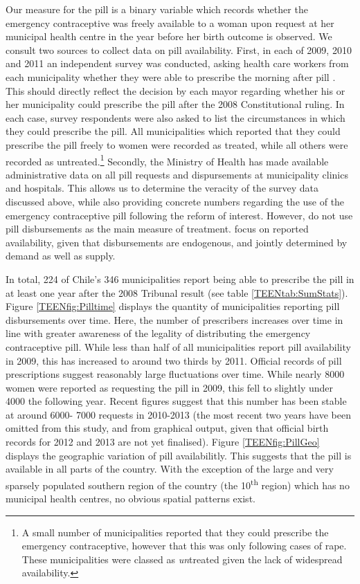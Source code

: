 Our measure for the pill is a binary variable which records whether the 
emergency contraceptive was freely available to a woman upon request at her 
municipal health centre in the year before her birth outcome is observed.  We
consult two sources to collect data on pill availability.  First, in each of 
2009, 2010 and 2011 an independent survey was conducted, asking health care 
workers from each municipality whether they were able to prescribe the morning
after pill \citep{Didesetal2009,Didesetal2010,Didesetal2011}. This should 
directly reflect the decision by each mayor regarding whether his or her
municipality could prescribe the pill after the 2008 Constitutional ruling.  
In each case, survey respondents were also asked to list the circumstances in 
which they could prescribe the pill.  All municipalities which reported that
they could prescribe the pill freely to women were recorded as treated, while 
all others were recorded as untreated.\footnote{A small number of 
municipalities reported that they could prescribe the emergency contraceptive, 
however that this was only following cases of rape.  These municipalities were 
classed as \emph{un}treated given the lack of widespread availability.}  
Secondly, the Ministry of Health has made available administrative data on 
all pill requests and dispursements at municipality clinics and hospitals.  This
allows us to determine the veracity of the survey data discussed above, 
while also providing concrete numbers regarding the use of the emergency 
contraceptive pill following the reform of interest.  However, \person do not
use pill disbursements as the main measure of treatment.  \Person focus on
reported availability, given that disbursements are endogenous, and jointly
determined by demand as well as supply.

In total, 224 of Chile's 346 municipalities report being able to prescribe the 
pill in at least one year after the 2008 Tribunal result (see table 
\ref{TEENtab:SumStats}). Figure \ref{TEENfig:Pilltime} displays the quantity
of municipalities reporting pill disbursements over time.  Here, the number
of prescribers increases over time in line with greater awareness of the legality 
of distributing the emergency contraceptive pill.  While less than half of all
municipalities report pill availability in 2009, this has increased to around
two thirds by 2011.  Official records of pill prescriptions suggest reasonably
large fluctuations over time.  While nearly 8000 women were reported as 
requesting the pill in 2009, this fell to slightly under 4000 the following
year.  Recent figures suggest that this number has been stable at around 6000-%
7000 requests in 2010-2013 (the most recent two years have been omitted from
this study, and from graphical output, given that official birth records for
2012 and 2013 are not yet finalised).  Figure \ref{TEENfig:PillGeo} displays
the geographic variation of pill availabilitly.  This suggests that the pill
is available in all parts of the country. With the exception of the large and 
very sparsely populated southern region of the country (the 
10\textsuperscript{th} region) which has no municipal health centres, no 
obvious spatial patterns exist.

